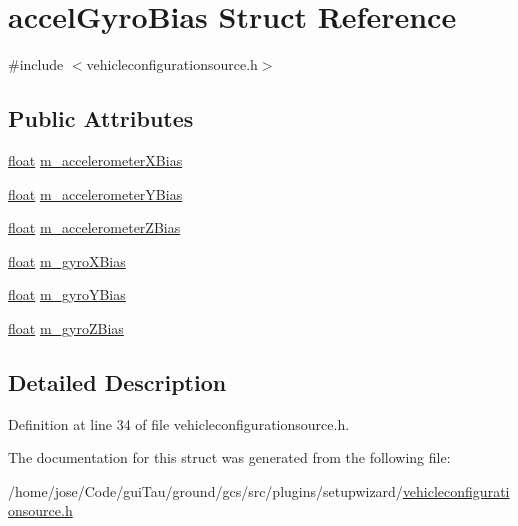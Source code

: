 \hypertarget{structaccel_gyro_bias}{\section{accel\-Gyro\-Bias Struct Reference}
\label{structaccel_gyro_bias}
}


{\ttfamily \#include $<$vehicleconfigurationsource.\-h$>$}

\subsection*{Public Attributes}
\begin{DoxyCompactItemize}
\item 
\hyperlink{_super_l_u_support_8h_a6a1bb6ed41f44b60e7bd83b0e9945aa7}{float} \hyperlink{group___vehicle_configuration_source_ga982c33b20f567fe289dd461ce9bb0df2}{m\-\_\-accelerometer\-X\-Bias}
\item 
\hyperlink{_super_l_u_support_8h_a6a1bb6ed41f44b60e7bd83b0e9945aa7}{float} \hyperlink{group___vehicle_configuration_source_ga76b3af5f8c4f87a92045a698eb32c681}{m\-\_\-accelerometer\-Y\-Bias}
\item 
\hyperlink{_super_l_u_support_8h_a6a1bb6ed41f44b60e7bd83b0e9945aa7}{float} \hyperlink{group___vehicle_configuration_source_gaa0475cba1c09df9c39a69bbb62711b8e}{m\-\_\-accelerometer\-Z\-Bias}
\item 
\hyperlink{_super_l_u_support_8h_a6a1bb6ed41f44b60e7bd83b0e9945aa7}{float} \hyperlink{group___vehicle_configuration_source_ga483a0631083ce446a08b73ecc712ed73}{m\-\_\-gyro\-X\-Bias}
\item 
\hyperlink{_super_l_u_support_8h_a6a1bb6ed41f44b60e7bd83b0e9945aa7}{float} \hyperlink{group___vehicle_configuration_source_gade8f76b5b608f6446cb182c372598e53}{m\-\_\-gyro\-Y\-Bias}
\item 
\hyperlink{_super_l_u_support_8h_a6a1bb6ed41f44b60e7bd83b0e9945aa7}{float} \hyperlink{group___vehicle_configuration_source_ga637101f3cecb351e7fe8d6106dd50d15}{m\-\_\-gyro\-Z\-Bias}
\end{DoxyCompactItemize}


\subsection{Detailed Description}


Definition at line 34 of file vehicleconfigurationsource.\-h.



The documentation for this struct was generated from the following file\-:\begin{DoxyCompactItemize}
\item 
/home/jose/\-Code/gui\-Tau/ground/gcs/src/plugins/setupwizard/\hyperlink{vehicleconfigurationsource_8h}{vehicleconfigurationsource.\-h}\end{DoxyCompactItemize}
